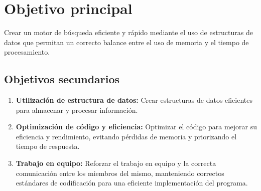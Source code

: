 \section{Objetivo principal}
Crear un motor de búsqueda eficiente y rápido mediante el uso de estructuras de datos que permitan un correcto balance entre el uso de memoria y el tiempo de procesamiento.

\subsection{Objetivos secundarios}
\begin{enumerate}
    \item \textbf{Utilización de estructura de datos:} Crear estructuras de datos eficientes para almacenar y procesar información.
    \item \textbf{Optimización de código y eficiencia:} Optimizar el código para mejorar su eficiencia y rendimiento, evitando pérdidas de memoria y priorizando el tiempo de respuesta.
    \item \textbf{Trabajo en equipo:} Reforzar el trabajo en equipo y la correcta comunicación entre los miembros del mismo, manteniendo correctos estándares de codificación para una eficiente implementación del programa.
\end{enumerate}